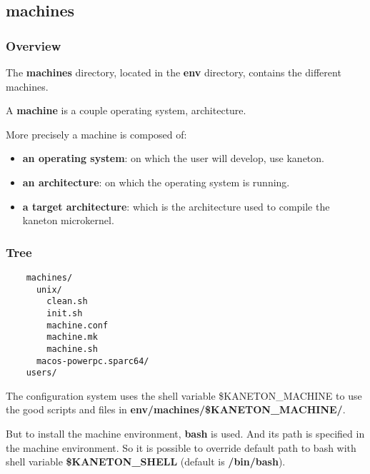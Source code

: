 %
%

\subsection{machines}


\begin{frame}
  \frametitle{Overview}

  The \textbf{machines} directory, located in the \textbf{env} directory,
  contains the different machines.

  \nl

  A \textbf{machine} is a couple operating system, architecture.

  \nl

  More precisely a machine is composed of:

  \begin{itemize}[<+->]
    \item
      \textbf{an operating system}: on which the user will develop,
      use kaneton.
    \item
      \textbf{an architecture}: on which the operating system
      is running.
    \item
      \textbf{a target architecture}: which is the architecture used
      to compile the kaneton microkernel.
  \end{itemize}
\end{frame}


\begin{frame}[containsverbatim]
  \frametitle{Tree}

  \begin{verbatim}
    machines/
      unix/
        clean.sh
        init.sh
        machine.conf
        machine.mk
        machine.sh
      macos-powerpc.sparc64/
    users/
  \end{verbatim}

  The configuration system uses the shell variable \$KANETON\_MACHINE to
  use the good scripts and files in \textbf{env/machines/\$KANETON\_MACHINE/}.

  \nl

  But to install the machine environment, \textbf{bash} is used. And its
  path is specified in the machine environment. So it is possible to override
  default path to bash with shell variable \textbf{\$KANETON\_SHELL} (default
  is \textbf{/bin/bash}).
\end{frame}


